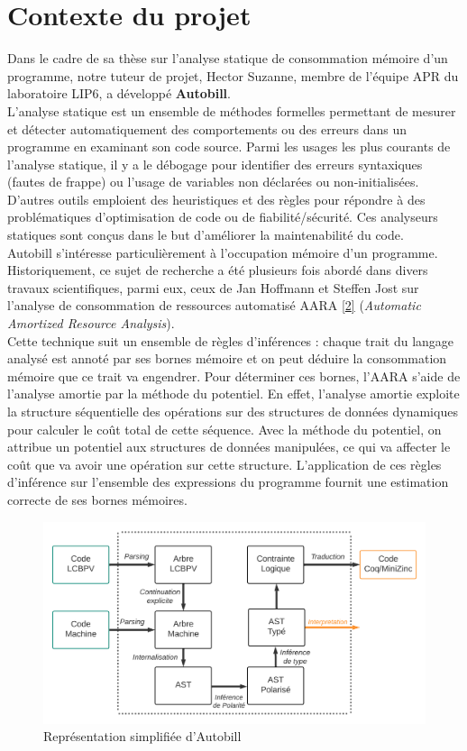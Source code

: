 \documentclass[12pt]{article}
\begin{document}
\section{Contexte du projet}\label{contexte-du-projet}
Dans le cadre de sa thèse sur l'analyse statique de consommation
mémoire d'un programme, notre tuteur de projet, Hector Suzanne, membre de l'équipe APR du laboratoire LIP6, a développé \textbf{Autobill}. \\
L'analyse statique est un ensemble de méthodes formelles permettant de
mesurer et détecter automatiquement des comportements ou des erreurs dans un
programme en examinant son code source. Parmi les usages les plus courants 
de l'analyse statique, il y a le débogage pour identifier des erreurs 
syntaxiques (fautes de frappe) ou l'usage de variables non déclarées ou 
non-initialisées. D'autres outils emploient des heuristiques et des règles pour répondre à des problématiques d'optimisation de code ou de fiabilité/sécurité. Ces analyseurs statiques sont conçus dans le but d'améliorer la maintenabilité du code. \\ 
Autobill s'intéresse particulièrement à l'occupation mémoire d'un programme. Historiquement, 
ce sujet de recherche a été plusieurs fois abordé dans divers travaux scientifiques, parmi eux, ceux de Jan Hoffmann et Steffen Jost sur l'analyse de consommation de ressources automatisé AARA
\protect\hyperlink{ref-Hoffmann}{{[}2{]}} (\emph{Automatic Amortized
Resource Analysis}).\\ 
Cette technique suit un ensemble de règles d'inférences : chaque trait du langage analysé est annoté par ses bornes mémoire et on peut déduire la consommation mémoire que ce trait va engendrer. Pour déterminer ces bornes, l'AARA s'aide de l'analyse amortie par la méthode du potentiel. En effet, l'analyse amortie exploite la structure séquentielle des opérations sur des structures de données dynamiques pour calculer le coût total de cette séquence. Avec la méthode du potentiel, on attribue un potentiel aux structures de données manipulées, ce qui va affecter le coût que va avoir une opération sur cette structure. L’application de ces règles d'inférence sur l'ensemble des expressions du programme fournit une estimation correcte de ses bornes mémoires.
\begin{figure}[!b]
  \centering
  \includegraphics[scale=0.55]{Figures/Schema_Autobill.png}
  \caption{Représentation simplifiée d'Autobill\label{fig1}}
\end{figure}
\end{document}
